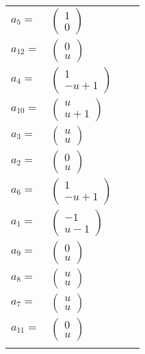 \documentclass[1p]{elsarticle_modified}
\theoremstyle{definition}
\begin{document}
\begin{tabular}{m{7pt} m{180pt} m{7pt} m{180pt} }
\flushright $a_{5}=$&$\begin{pmatrix}1\\0\end{pmatrix}$ \\
\flushright $a_{12}=$&$\begin{pmatrix}0\\u\end{pmatrix}$ \\
\flushright $a_{4}=$&$\begin{pmatrix}1\\- u+1\end{pmatrix}$ \\
\flushright $a_{10}=$&$\begin{pmatrix}u\\u+1\end{pmatrix}$ \\
\flushright $a_{3}=$&$\begin{pmatrix}u\\u\end{pmatrix}$ \\
\flushright $a_{2}=$&$\begin{pmatrix}0\\u\end{pmatrix}$ \\
\flushright $a_{6}=$&$\begin{pmatrix}1\\- u+1\end{pmatrix}$ \\
\flushright $a_{1}=$&$\begin{pmatrix}-1\\u-1\end{pmatrix}$ \\
\flushright $a_{9}=$&$\begin{pmatrix}0\\u\end{pmatrix}$ \\
\flushright $a_{8}=$&$\begin{pmatrix}u\\u\end{pmatrix}$ \\
\flushright $a_{7}=$&$\begin{pmatrix}u\\u\end{pmatrix}$ \\
\flushright $a_{11}=$&$\begin{pmatrix}0\\u\end{pmatrix}$\\&\end{tabular}
\end{document}
